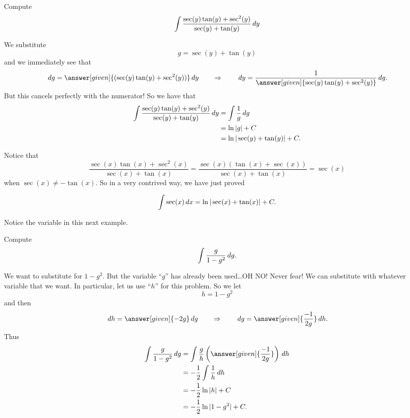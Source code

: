 \documentclass{ximera}
\begin{document}
\begin{example}
Compute
\[
\int \frac{\sec(y) \tan(y) + \sec^2(y)}{\sec(y) + \tan(y)} \,d y
\]
\begin{explanation}
We substitute
\[
g = \sec(y) + \tan(y)
\]
and we immediately see that
\[
\d g = \answer[given]{(\sec(y) \tan(y) + \sec^2(y))} \d y 	\qquad	\Rightarrow	\qquad	\d y = \frac{1}{\answer[given]{\sec(y) \tan(y) + \sec^2(y)}} \d g.
\]
But this cancels perfectly with the numerator!  
So we have that
\begin{align*}
\int \frac{\sec(y) \tan(y) + \sec^2(y)}{\sec(y) + \tan(y)} \,d y &= \int \frac{1}{g} \,d g  \\
&= \ln|g| + C  \\
&= \ln| \sec(y) + \tan(y) | + C.
\end{align*}
\end{explanation}
\end{example}



Notice that 
\[
\frac{\sec(x) \tan(x) + \sec^2(x)}{\sec(x) + \tan(x)} = \frac{\sec(x) (\tan(x) + \sec(x))}{\sec(x) + \tan(x)} = \sec(x)
\]
when $\sec(x) \neq - \tan(x)$.  
So in a very contrived way, we have just proved

\begin{theorem}
\[
\int \sec(x) \,d x = \ln|\sec(x) + \tan(x)| + C.
\]
\end{theorem}


Notice the variable in this next example.


\begin{example}\label{key example}
Compute
\[
\int \frac{g}{1-g^2} \,d g.
\]
\begin{explanation}
We want to substitute for $1-g^2$.  
But the variable ``$g$'' has already been used\dots OH NO!
Never fear! We can substitute with whatever variable that we want.  
In particular, let us use ``$h$'' for this problem.  
So we let
\[
h = 1 - g^2
\]
and then
\[
\d h = \answer[given]{-2g} \d g \qquad\Rightarrow\qquad\d g = \answer[given]{\frac{-1}{2g}} \d h.
\]
Thus
\begin{align*}
\int \frac{g}{1-g^2} \d g &= \int \frac{g}{h} \left( \answer[given]{\frac{-1}{2g}} \right) \d h  \\
&= - \frac{1}{2} \int \frac{1}{h} \d h  \\
&= - \frac{1}{2} \ln|h| + C  \\
&= - \frac{1}{2} \ln|1-g^2| + C.
\end{align*}
\end{explanation}
\end{example}
\end{document}
